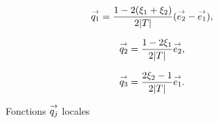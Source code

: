     \begin{figure}[!htb]
      \begin{minipage}{0.329\textwidth}
          \begin{center}
            \begin{tikzpicture}[scale=1]
              
            \end{tikzpicture}
          \end{center}
          \begin{equation*}
            \vect{q_1}=\frac{1-2(\xi_1+\xi_2)}{2|T|}(\vect{e_2}-\vect{e_1}),
          \end{equation*}
      \end{minipage}
      \begin{minipage}{0.329\textwidth}
          \begin{center}
            \begin{tikzpicture}[scale=1]
              
            \end{tikzpicture}
             \begin{equation*}
              \vect{q_2}=\frac{1-2\xi_1}{2|T|}\vect{e_2},
            \end{equation*}
          \end{center}
      \end{minipage}
      \begin{minipage}{0.329\textwidth}
          \begin{center}
            \begin{tikzpicture}[scale=1]
              
            \end{tikzpicture}
            \begin{equation*}
              \vect{q_3}=\frac{2\xi_2-1}{2|T|}\vect{e_1}.
            \end{equation*}
          \end{center}
      \end{minipage}
      \caption[Fonctions de Bendali modifiées]{Fonctions \(\qj\) locales}
      \label{fig:form_int:fon_base:q}
    \end{figure}

